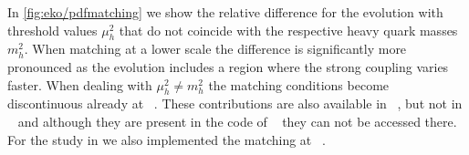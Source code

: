 In \cref{fig:eko/pdfmatching} we show the relative difference for the \pdf{} evolution with
threshold values $\mu_h^2$ that do not coincide with the respective heavy
quark masses $m_h^2$. When matching at a lower scale the difference is
significantly more pronounced as the evolution includes
a region where the strong coupling varies faster. When dealing 
with $\mu_h^2 \neq m_h^2$ the \pdf{} matching conditions become discontinuous
already at \nlo{}~\cite{Buza_1998}. These contributions are also available in
\apfel{}~\cite{Bertone:2013vaa}, but not in \pegasus{}~\cite{Vogt:2004ns} and although they are present in the code
of \qcdnum{}~\cite{Botje:2010ay} they can not be accessed there.
For the study in \cite{Ball:2022qks} we also implemented the \pdf{} matching at
\nnnlo{}~\cite{Bierenbaum:2009zt,Bierenbaum:2009mv,Ablinger:2010ty,Ablinger:2014vwa,Ablinger:2014uka,Behring:2014eya,Ablinger_2014,Ablinger_2015,Blumlein:2017wxd}.
